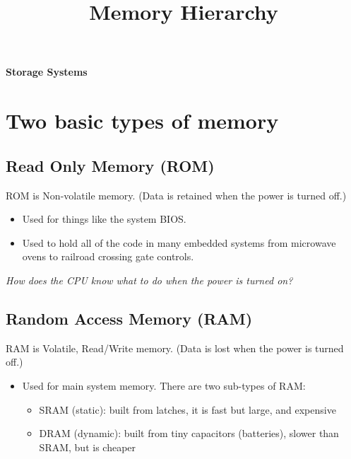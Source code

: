 \documentclass[10pt]{article}
\begin{document}

\title{Memory Hierarchy}
\thispagestyle{fancy}

\centerline{\Huge\sf\bfseries Storage Systems}



\section{Two basic types of memory}

\subsection{Read Only Memory (ROM)}

ROM is Non-volatile memory. (Data is retained when the power is turned off.)

\begin{itemize}
\item Used for things like the system BIOS.
\item Used to hold all of the code in many embedded systems from microwave ovens to railroad crossing gate controls.
\end{itemize}

{\em How does the CPU know what to do when the power is turned on?}




\subsection{Random Access Memory (RAM)}
RAM is Volatile, Read/Write memory. (Data is lost when the power is turned off.)

\begin{itemize}
\item Used for main system memory. There are two sub-types of RAM:
\begin{itemize}
\item SRAM (static): built from latches, it is fast but large, and expensive
\item DRAM (dynamic): built from tiny capacitors (batteries), slower than SRAM, but is cheaper
\end{itemize}

\end{itemize}
\end{document}

